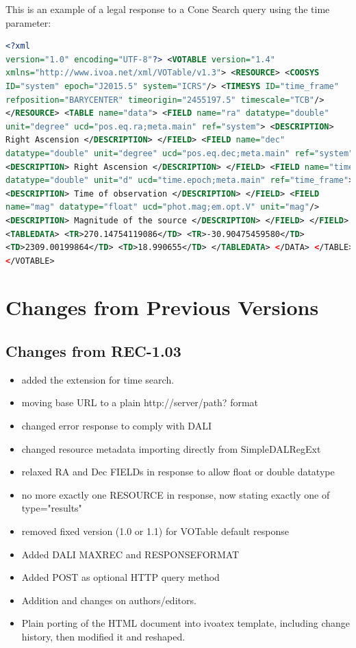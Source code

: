 \documentclass[11pt,a4paper]{ivoa} 
\begin{document}

This is an example of a legal response to a Cone Search query using the
time parameter:
\begin{lstlisting}[language=XML,basicstyle=\footnotesize] <?xml
version="1.0" encoding="UTF-8"?> <VOTABLE version="1.4"
xmlns="http://www.ivoa.net/xml/VOTable/v1.3"> <RESOURCE> <COOSYS
ID="system" epoch="J2015.5" system="ICRS"/> <TIMESYS ID="time_frame"
refposition="BARYCENTER" timeorigin="2455197.5" timescale="TCB"/>
</RESOURCE> <TABLE name="data"> <FIELD name="ra" datatype="double"
unit="degree" ucd="pos.eq.ra;meta.main" ref="system"> <DESCRIPTION>
Right Ascension </DESCRIPTION> </FIELD> <FIELD name="dec"
datatype="double" unit="degree" ucd="pos.eq.dec;meta.main" ref="system">
<DESCRIPTION> Right Ascension </DESCRIPTION> </FIELD> <FIELD name="time"
datatype="double" unit="d" ucd="time.epoch;meta.main" ref="time_frame">
<DESCRIPTION> Time of observation </DESCRIPTION> </FIELD> <FIELD
name="mag" datatype="float" ucd="phot.mag;em.opt.V" unit="mag"/>
<DESCRIPTION> Magnitude of the source </DESCRIPTION> </FIELD> </FIELD>
<TABLEDATA> <TR>270.14754119086</TD> <TR>-30.90475459580</TD>
<TD>2309.00199864</TD> <TD>18.990655</TD> </TABLEDATA> </DATA> </TABLE>
</VOTABLE> \end{lstlisting}


\section{Changes from Previous Versions} \label{app:changes}

\subsection{Changes from REC-1.03} \begin{itemize}[noitemsep] \item
added the extension for time search.  \item moving base URL to a plain
http://server/path? format \item changed error response to comply with
DALI \item changed resource metadata importing directly from
SimpleDALRegExt \item relaxed RA and Dec FIELDs in response to allow
float or double datatype \item no more exactly one RESOURCE in response,
now stating exactly one of type="results" \item removed fixed version
(1.0 or 1.1) for VOTable default response \item Added DALI MAXREC and
RESPONSEFORMAT \item Added POST as optional HTTP query method \item
Addition and changes on authors/editors.  \item Plain porting of the
HTML document into ivoatex template, including change history, then
modified it and reshaped.  \end{itemize}
\end{document}
